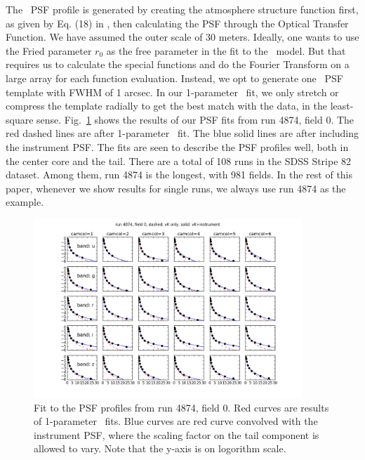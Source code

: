 The \vk~PSF profile is generated by creating the atmosphere
structure function first, as given by Eq. (18) in \cite{Tokovinin2002}, then calculating the
PSF through the Optical Transfer Function. We have assumed the
outer scale of 30 meters.
Ideally, one wants to use the Fried parameter $r_0$ as the free
parameter in the fit to the \vk~model. 
But that requires us to calculate the special functions and do the
Fourier Transform on a large array for each function evaluation.
Instead, we opt to generate one \vk~PSF template with FWHM of 1
arcsec. In our 1-parameter \vk~fit, we only stretch or compress
the template radially to get the best match with the data, in the
least-square sense.
Fig.~\ref{fig:psffit} shows the results of our PSF fits from run 4874,
field 0. The red dashed lines are after 1-parameter \vk~fit. 
The blue solid lines are after including the instrument PSF.
The fits are seen to describe the PSF profiles well, both in
the center core and the tail.
There are a total of 108 runs in the SDSS Stripe 82 dataset.
Among them, run 4874 is the longest, with 981 fields. In the rest of
this paper, whenever we show
results for single runs, we always use run 4874 as the example.

\begin{figure}
\centering
\includegraphics[width=0.9\textwidth]{FIGURES/psffit.png}
\caption{Fit to the PSF profiles from run 4874, field 0. Red curves
  are results of 1-parameter \vk~fits. Blue curves are red
  curve convolved with the instrument PSF, where the scaling factor on
  the tail component is allowed to vary. Note that the y-axis is on
  logorithm scale.
\label{fig:psffit}}
\end{figure}
